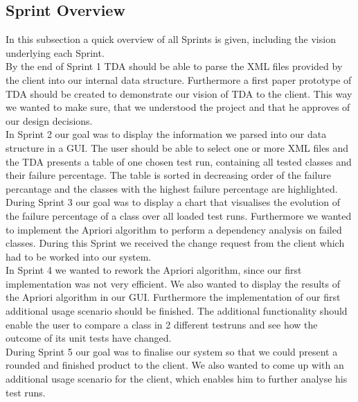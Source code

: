 
\subsection{Sprint Overview}

In this subsection a quick overview of all Sprints is given, including the vision underlying each Sprint. \\
By the end of Sprint 1 TDA should be able to parse the XML files provided by the client into our internal data structure. Furthermore a first paper prototype of TDA should be created to demonstrate our vision of TDA to the client. This way we wanted to make sure, that we understood the project and that he approves of our design decisions. \\ 
In Sprint 2 our goal was to display the information we parsed into our data structure in a GUI. The user should be able to select one or more XML files and the TDA presents a table of one chosen test run, containing all tested classes and their failure percentage. The table is sorted in decreasing order of the failure percantage and the classes with the highest failure percentage are highlighted. \\ 
During Sprint 3 our goal was to display a chart that visualises the evolution of the failure percentage of a class over all loaded test runs. Furthermore we wanted to implement the Apriori algorithm to perform a dependency analysis on failed classes. During this Sprint we received the change request from the client which had to be worked into our system. \\ 
In Sprint 4 we wanted to rework the Apriori algorithm, since our first implementation was not very efficient. We also wanted to display the results of the Apriori algorithm in our GUI. Furthermore the implementation of our first additional usage scenario should be finished. The additional functionality should enable the user to compare a class in 2 different testruns and see how the outcome of its unit tests have changed. \\ 
During Sprint 5 our goal was to finalise our system so that we could present a rounded and finished product to the client. We also wanted to come up with an additional usage scenario for the client, which enables him to further analyse his test runs. \\ 
